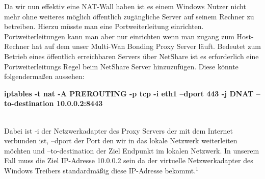 Da wir nun effektiv eine NAT-Wall haben ist es einem Windows Nutzer nicht mehr ohne weiteres möglich öffentlich zugängliche Server auf seinem Rechner zu betreiben. Hierzu müsste man eine Portweiterleitung einrichten. Portweiterleitungen kann man aber nur einrichten wenn man zugang zum Host-Rechner hat auf dem unser Multi-Wan Bonding Proxy Server läuft. Bedeutet zum Betrieb eines öffentlich erreichbaren Servers über NetShare ist es erforderlich eine Portweiterleitungs Regel beim NetShare Server hinzuzufügen. Diese könnte folgendermaßen aussehen:
\\ 
\begin{center}
    \textbf{iptables -t nat -A PREROUTING -p tcp -i eth1 --dport 443 -j DNAT --to-destination 10.0.0.2:8443}
\end{center}
\ \\
Dabei ist -i der Netzwerkadapter des Proxy Servers der mit dem Internet verbunden ist, --dport der Port den wir in das lokale Netzwerk weiterleiten möchten und --to-destination der Ziel Endpunkt im lokalen Netzwerk. In unserem Fall muss die Ziel IP-Adresse 10.0.0.2 sein da der virtuelle Netzwerkadapter des Windows Treibers standardmäßig diese IP-Adresse bekommt.$^{1}$